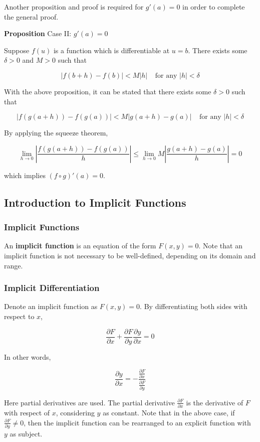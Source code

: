 \documentclass[a4paper,12pt]{article}
\newcommand{\s}{\vspace{1mm}}
\newcommand{\n}{\vspace{3mm}}
\newenvironment{block}[4][Block]{ %
\begin{list}{}{
  \setlength{\leftmargin}{0mm}
  \setlength{\rightmargin}{0mm}
  \setlength{\topsep}{0mm}
  \setlength{\partopsep}{0mm}
  \parsep\parskip
  \setlength{\itemsep}{-\parsep}
  }
  \needspace{\baselineskip}
  \item \textbf{#2 #3} \hspace{1mm} #4
  \vspace{1mm}
  \item
  }
{
\end{list}
}
\begin{document}
Another proposition and proof is required for $g'(a)=0$ in order to complete the general proof.\n

\begin{block}{Proposition}{}{Case II: $g'(a)=0$}
  Suppose $f(u)$ is a function which is differentiable at $u=b$. There exists some $\delta>0$ and $M>0$ such that

  $$\left| f(b+h)-f(b)\right| <M\left| h\right| \;\;\;\;\text{for any }\left| h\right| <\delta$$
\end{block}\n

With the above proposition, it can be stated that there exists some $\delta>0$ such that

$$\left| f(g(a+h))-f(g(a))\right| <M\left| g(a+h)-g(a)\right| \;\;\;\;\text{for any }\left| h\right| <\delta$$\s

By applying the squeeze theorem,

$$\lim_{h\to 0}\left| \frac{f(g(a+h))-f(g(a))}{h}\right| \leq\lim_{h\to 0}M\left| \frac{g(a+h)-g(a)}{h}\right| =0$$\s

which implies $(f\circ g)'(a)=0$.

\subsection{Introduction to Implicit Functions}
\subsubsection{Implicit Functions}
An \textbf{implicit function} is an equation of the form $F(x,y)=0$. Note that an implicit function is not necessary to be well-defined, depending on its domain and range.

\subsubsection{Implicit Differentiation}
Denote an implicit function as $F(x,y)=0$. By differentiating both sides with respect to $x$,

$$\frac{\partial F}{\partial x}+\frac{\partial F}{\partial y}\frac{\partial y}{\partial x}=0$$\s

In other words,

$$\frac{\partial y}{\partial x}=-\frac{\frac{\partial F}{\partial x}}{\frac{\partial F}{\partial y}}$$\s

Here partial derivatives are used. The partial derivative $\frac{\partial F}{\partial x}$ is the derivative of $F$ with respect of $x$, considering $y$ as constant. Note that in the above case, if $\frac{\partial F}{\partial y}\neq 0$, then the implicit function can be rearranged to an explicit function with $y$ as subject.
\end{document}
